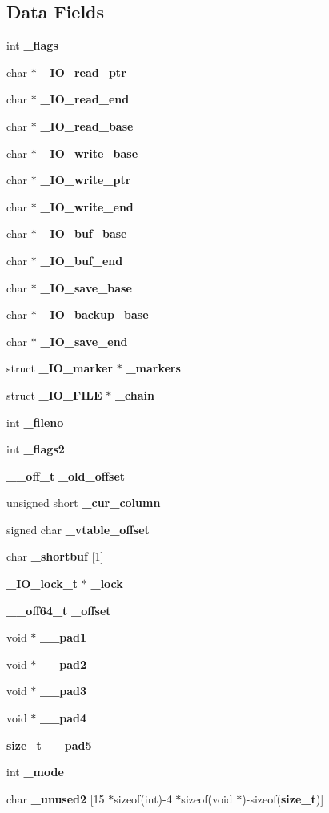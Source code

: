 \subsection*{Data Fields}
\begin{DoxyCompactItemize}
\item 
int {\bf \_\-flags}
\item 
char $\ast$ {\bf \_\-IO\_\-read\_\-ptr}
\item 
char $\ast$ {\bf \_\-IO\_\-read\_\-end}
\item 
char $\ast$ {\bf \_\-IO\_\-read\_\-base}
\item 
char $\ast$ {\bf \_\-IO\_\-write\_\-base}
\item 
char $\ast$ {\bf \_\-IO\_\-write\_\-ptr}
\item 
char $\ast$ {\bf \_\-IO\_\-write\_\-end}
\item 
char $\ast$ {\bf \_\-IO\_\-buf\_\-base}
\item 
char $\ast$ {\bf \_\-IO\_\-buf\_\-end}
\item 
char $\ast$ {\bf \_\-IO\_\-save\_\-base}
\item 
char $\ast$ {\bf \_\-IO\_\-backup\_\-base}
\item 
char $\ast$ {\bf \_\-IO\_\-save\_\-end}
\item 
struct {\bf \_\-IO\_\-marker} $\ast$ {\bf \_\-markers}
\item 
struct {\bf \_\-IO\_\-FILE} $\ast$ {\bf \_\-chain}
\item 
int {\bf \_\-fileno}
\item 
int {\bf \_\-flags2}
\item 
{\bf \_\-\_\-off\_\-t} {\bf \_\-old\_\-offset}
\item 
unsigned short {\bf \_\-cur\_\-column}
\item 
signed char {\bf \_\-vtable\_\-offset}
\item 
char {\bf \_\-shortbuf} [1]
\item 
{\bf \_\-IO\_\-lock\_\-t} $\ast$ {\bf \_\-lock}
\item 
{\bf \_\-\_\-off64\_\-t} {\bf \_\-offset}
\item 
void $\ast$ {\bf \_\-\_\-pad1}
\item 
void $\ast$ {\bf \_\-\_\-pad2}
\item 
void $\ast$ {\bf \_\-\_\-pad3}
\item 
void $\ast$ {\bf \_\-\_\-pad4}
\item 
{\bf size\_\-t} {\bf \_\-\_\-pad5}
\item 
int {\bf \_\-mode}
\item 
char {\bf \_\-unused2} [15 $\ast$sizeof(int)-\/4 $\ast$sizeof(void $\ast$)-\/sizeof({\bf size\_\-t})]
\end{DoxyCompactItemize}


